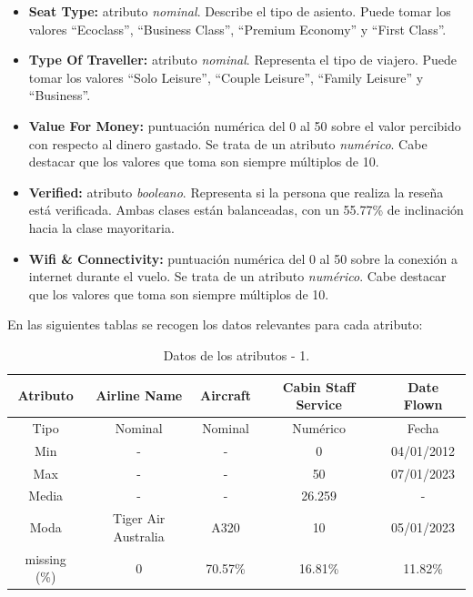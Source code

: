 \documentclass[es]{uc3mreport}
\begin{document}
\begin{report}
\begin{itemize}
    \item \textbf{Seat Type:} atributo \textit{nominal}. Describe el tipo de asiento. Puede tomar los valores ``Ecoclass'',  ``Business Class'', ``Premium Economy'' y ``First Class''.
    \item \textbf{Type Of Traveller:} atributo \textit{nominal}. Representa el tipo de viajero. Puede tomar los valores ``Solo Leisure'', ``Couple Leisure'', ``Family Leisure'' y ``Business''.
    \item \textbf{Value For Money:} puntuación numérica del 0 al 50 sobre el valor percibido con respecto al dinero gastado. Se trata de un atributo \textit{numérico}. Cabe destacar que los valores que toma son siempre múltiplos de 10.
    \item \textbf{Verified:} atributo \textit{booleano}. Representa si la persona que realiza la reseña está verificada. Ambas clases están balanceadas, con un 55.77\% de inclinación hacia la clase mayoritaria.
    \item \textbf{Wifi \& Connectivity:} puntuación numérica del 0 al 50 sobre la conexión a internet durante el vuelo. Se trata de un atributo \textit{numérico}. Cabe destacar que los valores que toma son siempre múltiplos de 10.
\end{itemize}
En las siguientes tablas se recogen los datos relevantes para cada atributo:
\begin{table}[H]
    \center
    \begin{tabular}{@{}ccccc@{}}
        \toprule
        Atributo & Airline Name       & Aircraft & Cabin Staff Service & Date Flown \\
        \midrule
        Tipo     & Nominal            & Nominal  & Numérico            & Fecha      \\
        Min      & -                  & -        & 0                   & 04/01/2012 \\
        Max      & -                  & -        & 50                  & 07/01/2023 \\
        Media    & -                  & -        & 26.259              & -          \\
        Moda     & Tiger Air Australia& A320     & 10                  & 05/01/2023 \\
        missing (\%) & 0              & 70.57\%  & 16.81\%             & 11.82\%    \\
        \bottomrule
    \end{tabular}
    \caption{Datos de los atributos - 1.}
\end{table}


\end{report}
\end{document}
